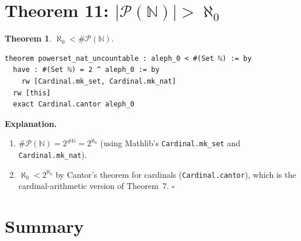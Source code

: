 \documentclass[11pt]{article}
\theoremstyle{plain}
\newtheorem{theorem}{Theorem}[section]
\theoremstyle{definition}
\begin{document}
\section{Theorem 11: $|\mathcal{P}(\mathbb{N})| > \aleph_0$}

\begin{theorem}
$\aleph_0 < \#\mathcal{P}(\mathbb{N})$.
\end{theorem}

\begin{lstlisting}
theorem powerset_nat_uncountable : aleph_0 < #(Set ℕ) := by
  have : #(Set ℕ) = 2 ^ aleph_0 := by
    rw [Cardinal.mk_set, Cardinal.mk_nat]
  rw [this]
  exact Cardinal.cantor aleph_0
\end{lstlisting}

\textbf{Explanation.}
\begin{enumerate}
  \item $\#\mathcal{P}(\mathbb{N}) = 2^{\#\mathbb{N}} = 2^{\aleph_0}$ (using
        Mathlib's \texttt{Cardinal.mk\_set} and \texttt{Cardinal.mk\_nat}).
  \item $\aleph_0 < 2^{\aleph_0}$ by Cantor's theorem for cardinals
        (\texttt{Cardinal.cantor}), which is the cardinal-arithmetic version
        of Theorem~7. $\square$
\end{enumerate}

\section*{Summary}
\end{document}

